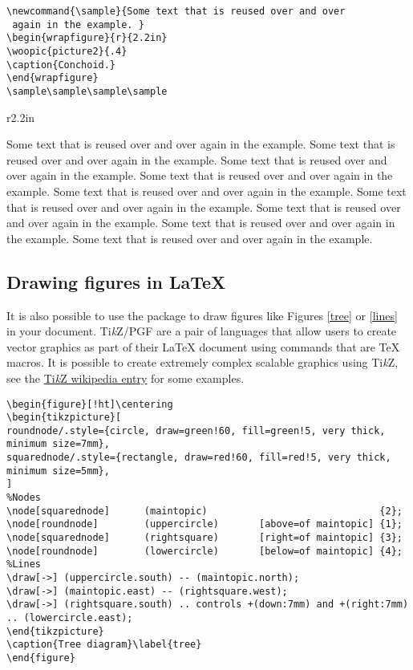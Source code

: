 \begin{singlespace}\small
\begin{verbatim}
\newcommand{\sample}{Some text that is reused over and over
 again in the example. }
\begin{wrapfigure}{r}{2.2in}
\woopic{picture2}{.4}
\caption{Conchoid.}
\end{wrapfigure}
\sample\sample\sample\sample
\end{verbatim}
\end{singlespace}

\newcommand{\sample}{Some text that is reused over and over again in the example. }
\begin{wrapfigure}{r}{2.2in}
\caption{Conchoid.}
\end{wrapfigure}
\sample\sample\sample\sample\sample\sample\sample\sample\sample

\subsection{Drawing figures in \LaTeX{}}

It is also possible to use the  package to draw figures like Figures \ref{tree} or \ref{lines} in your document. Ti\emph{k}Z/PGF are a pair of languages that allow users to create vector graphics as part of their \LaTeX{} document using commands that are \TeX{} macros. It is possible to create extremely complex scalable graphics using Ti\emph{k}Z, see the \href{https://en.wikipedia.org/wiki/PGF/TikZ}{Ti\emph{k}Z wikipedia entry} for some examples.

\begin{singlespace}\small
\begin{verbatim}
\begin{figure}[!ht]\centering
\begin{tikzpicture}[
roundnode/.style={circle, draw=green!60, fill=green!5, very thick, minimum size=7mm},
squarednode/.style={rectangle, draw=red!60, fill=red!5, very thick, minimum size=5mm},
]
%Nodes
\node[squarednode]      (maintopic)                              {2};
\node[roundnode]        (uppercircle)       [above=of maintopic] {1};
\node[squarednode]      (rightsquare)       [right=of maintopic] {3};
\node[roundnode]        (lowercircle)       [below=of maintopic] {4};
%Lines
\draw[->] (uppercircle.south) -- (maintopic.north);
\draw[->] (maintopic.east) -- (rightsquare.west);
\draw[->] (rightsquare.south) .. controls +(down:7mm) and +(right:7mm) .. (lowercircle.east);
\end{tikzpicture}
\caption{Tree diagram}\label{tree}
\end{figure}
\end{verbatim}
\end{singlespace}

